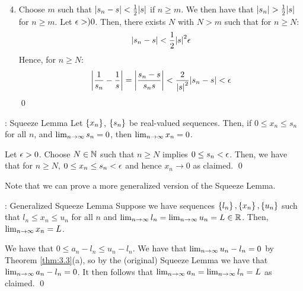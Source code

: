 \begin{nproofcont}
    \begin{enumerate}
        \setcounter{enumi}{3}
        \item Choose $m$ such that $\abs{s_n - s} < \frac{1}{2}\abs{s}$ if $n \geq m$. We then have that $\abs{s_n} > \frac{1}{2}\abs{s}$ for $n \geq m$. Let $\epsilon > )0$. Then, there exists $N$ with $N > m$ such that for $n \geq N$:
        \begin{align*}
            \abs{s_n - s} < \frac{1}{2}\abs{s}^2\epsilon
        \end{align*}
        Hence, for $n \geq N$:
        \begin{align*}
            \abs{\frac{1}{s_n} - \frac{1}{s}} = \abs{\frac{s_n - s}{s_ns}} < \frac{2}{\abs{s}^2}\abs{s_n - s} < \epsilon
        \end{align*}
        \qed
    \end{enumerate}
\end{nproofcont}

\begin{nlemma}{: Squeeze Lemma}{}
    Let $\set{x_n}$, $\set{s_n}$ be real-valued sequences. Then, if $0 \leq x_n \leq s_n$ for all $n$, and $\lim_{n \rightarrow \infty} s_n = 0$, then $\lim_{n \rightarrow \infty} x_n = 0$.
\end{nlemma}
\begin{nproof}
    Let $\epsilon > 0$. Choose $N \in \mathbb{N}$ such that $n \geq N$ implies $0 \leq s_n < \epsilon$. Then, we have that for $n \geq N$, $0 \leq x_n \leq s_n < \epsilon$ and hence $x_n \rightarrow 0$ as claimed. \qed
\end{nproof}

\noindent Note that we can prove a more generalized version of the Squeeze Lemma. 

\begin{nlemma}{: Generalized Squeeze Lemma}{}
    Suppose we have sequences $\set{l_n}, \set{x_n}, \set{u_n}$ such that $l_n \leq x_n \leq u_n$ for all $n$ and $\lim_{n \rightarrow \infty} l_n = \lim_{n \rightarrow \infty} u_n = L \in \mathbb{R}$. Then, $\lim_{n \rightarrow \infty} x_n = L$.
\end{nlemma}

\begin{nproof}
    We have that $0 \leq a_n - l_n \leq u_n - l_n$. We have that $\lim_{n \rightarrow \infty} u_n - l_n = 0$ by Theorem \ref{thm:3.3}(a), so by the (original) Squeeze Lemma we have that $\lim_{n \rightarrow \infty} a_n - l_n = 0$. It then follows that $\lim_{n \rightarrow \infty} a_n = \lim_{n \rightarrow \infty} l_n = L$ as claimed. \qed
\end{nproof}

